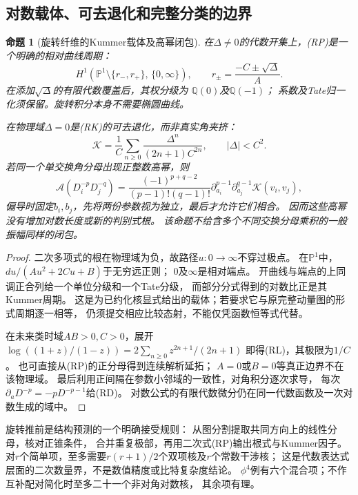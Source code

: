 \documentclass[11pt,a4paper]{ctexart}
\theoremstyle{cnplain}\newtheorem{theorem}{定理}[section]
\newtheorem{proposition}[theorem]{命题}
\theoremstyle{definition}\newtheorem{definition}[theorem]{定义}
\theoremstyle{remark}\newtheorem{remark}[theorem]{注}
\begin{document}
\subsection{对数载体、可去退化和完整分类的边界}
\begin{proposition}[旋转纤维的Kummer载体及高幂闭包]\label{prop:rotationkummer}
在$\Delta\ne0$的代数开集上，(RP)是一个明确的相对曲线周期：
\[
 H^1\!\left(\mathbb P^1\setminus\{r_-,r_+\},\,\{0,\infty\}\right),
 \qquad r_\pm=\frac{-C\pm\sqrt\Delta}{A}.
 \tag{RC}\label{eq:rotationcarrier}
\]
在添加$\sqrt\Delta$的有限代数覆盖后，其权分级为
$\mathbb Q(0)$及$\mathbb Q(-1)$；
系数及Tate归一化须保留。旋转积分本身不需要椭圆曲线。

在物理域$\Delta=0$是(RK)的可去退化，而非真实角夹挤：
\[
 \mathcal K=\frac1C\sum_{n\ge0}
       \frac{\Delta^n}{(2n+1)C^{2n}},\qquad |\Delta|<C^2 .
 \tag{RL}\label{eq:rotationlimit}
\]
若同一个单交换角分母出现正整数高幂，则
\[
 \mathcal A(D_i^{-p}D_j^{-q})=
 \frac{(-1)^{p+q-2}}{(p-1)!(q-1)!}
 \partial_{a_i}^{p-1}\partial_{a_j}^{q-1}\mathcal K(v_i,v_j),
 \tag{RD}\label{eq:rotationderivatives}
\]
偏导时固定$b_i,b_j$，先将两份参数视为独立，最后才允许它们相合。
因而这些高幂没有增加对数长度或新的判别式根。
该命题不给含多个不同交换分母乘积的一般振幅同样的闭包。
\end{proposition}
\begin{proof}
二次多项式的根在物理域为负，故路径$u:0\to\infty$不穿过极点。
在$\mathbb P^1$中，$du/(Au^2+2Cu+B)$于无穷远正则；
0及$\infty$是相对端点。
开曲线与端点的上同调正合列给一个单位分级和一个Tate分级，
而部分分式得到的对数比正是其Kummer周期。
这是为已约化核显式给出的载体；若要求它与原完整动量图的形式周期逐一相等，
仍须提交相应比较态射，不能仅凭函数恒等式代替。

在未来类时域$AB>0,C>0$，展开
$\log((1+z)/(1-z))=2\sum_{n\ge0}z^{2n+1}/(2n+1)$
即得(RL)，其极限为$1/C$。
也可直接从(RP)的正分母得到连续解析延拓；
$A=0$或$B=0$等真正边界不在该物理域。
最后利用正间隔在参数小邻域的一致性，对角积分逐次求导，
每次$\partial_a D^{-p}=-pD^{-p-1}$给(RD)。
对数公式的有限代数微分仍在同一代数函数及一次对数生成的域中。
\end{proof}

旋转推前是结构预测的一个明确接受规则：
从图分割提取共同方向上的线性分母，核对正锥条件，
合并重复极部，再用二次式(RP)输出根式与Kummer因子。
对$r$个简单项，至多需要$r(r+1)/2$个双项核及$r$个常数干涉核；
这是代数表达式层面的二次数量界，不是数值精度或比特复杂度结论。
$\phi^4$例有六个混合项；不作互补配对简化时至多二十一个非对角对数核，
其余项有理。
\end{document}
